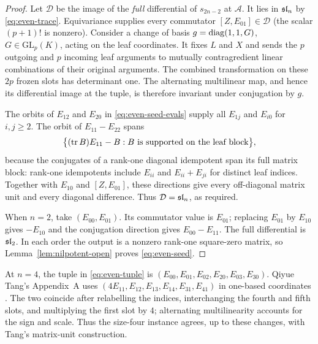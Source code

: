 \begin{proof}
Let $\mathcal D$ be the image of the \emph{full} differential of
$s_{2n-2}$ at $\mathcal A$. It lies in $\mathfrak{sl}_n$ by
\eqref{eq:even-trace}. Equivariance supplies every commutator
$[Z,E_{01}]\in\mathcal D$ (the scalar $(p+1)!$ is nonzero).
Consider a change of basis $g=\operatorname{diag}(1,1,G)$,
$G\in\mathrm{GL}_{p}(K)$, acting on the leaf coordinates.
It fixes $L$ and $X$ and sends the $p$ outgoing and $p$ incoming
leaf arguments to mutually contragredient linear combinations
of their original arguments. The combined transformation on
these $2p$ frozen slots has determinant one. The alternating
multilinear map, and hence its differential image at the tuple,
is therefore invariant under conjugation by $g$.

The orbits of $E_{12}$ and $E_{20}$ in
\eqref{eq:even-seed-evals} supply all $E_{1j}$ and $E_{i0}$
for $i,j\ge2$. The orbit of $E_{11}-E_{22}$ spans
\begin{equation}\label{eq:even-seed-block}
 \bigl\{(\operatorname{tr} B)E_{11}-B:
 B\text{ is supported on the leaf block}\bigr\},
\end{equation}
because the conjugates of a rank-one diagonal idempotent span
its full matrix block: rank-one idempotents include $E_{ii}$
and $E_{ii}+E_{ji}$ for distinct leaf indices.
Together with $E_{10}$ and $[Z,E_{01}]$, these directions give
every off-diagonal matrix unit and every diagonal difference.
Thus $\mathcal D=\mathfrak{sl}_n$, as required.

When $n=2$, take $(E_{00},E_{01})$.
Its commutator value is $E_{01}$; replacing $E_{01}$ by $E_{10}$
gives $-E_{10}$ and the conjugation direction gives
$E_{00}-E_{11}$. The full differential is $\mathfrak{sl}_2$.
In each order the output is a nonzero rank-one square-zero
matrix, so Lemma~\ref{lem:nilpotent-open} proves
\eqref{eq:even-seed}.
\end{proof}

\begin{remark}\label{rem:tang-seed}
At $n=4$, the tuple in \eqref{eq:even-tuple} is
$(E_{00},E_{01},E_{02},E_{20},E_{03},E_{30})$.
Qiyue Tang's Appendix~A uses
$(4E_{11},E_{12},E_{13},E_{14},E_{31},E_{41})$ in one-based
coordinates \cite[Proposition~11]{Tang2026FiveSix}.
The two coincide after relabelling the indices, interchanging
the fourth and fifth slots, and multiplying the first slot by
$4$; alternating multilinearity accounts for the sign and
scale. Thus the size-four instance agrees, up to these changes,
with Tang's matrix-unit construction.
\end{remark}

